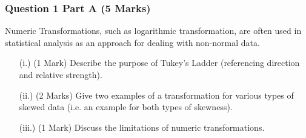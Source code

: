 \documentclass[a4paper,12pt]{article}
\begin{document}
	\subsubsection*{Question 1 Part A (5 Marks)}
	Numeric Transformations, such as logarithmic transformation, are often used in statistical analysis as an approach for dealing with non-normal data.
	\begin{itemize}
		\item[(i.)] (1 Mark) Describe the purpose of Tukey's Ladder (referencing direction and relative strength).
		\item[(ii.)] (2 Marks) Give two examples of a transformation for various types of skewed data (i.e. an example for both types of skewness).
		\item[(iii.)] (1 Mark) Discuss the limitations of numeric transformations.
	\end{itemize}
	\bigskip
	
\end{document}
